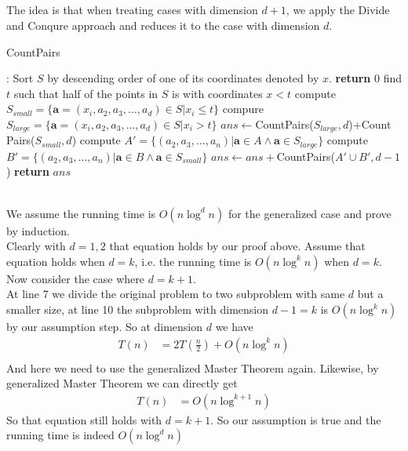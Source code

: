 \documentclass[12pt,letterpaper]{article}
\begin{document}
\subsection{}
The idea is that when treating cases with dimension $d+1$, we apply the Divide and Conqure approach and reduces it to the case with dimension $d$.
\begin{algorithm}
    \caption{CountPairs}\label{alg:countfinal}
    \begin{algorithmic}[1]
    :
    \State Sort $S$ by descending order of one of its coordinates denoted by $x$.
     \textbf{return} 0
    \EndIf
    \State find $t$ such that half of the points in $S$ is with coordinates $x<t$ 
    \State compute $S_{small}=\{\boldsymbol{a}=(x_i,a_2,a_3,\dots,a_d)\in S|x_i\leq t\}$ 
    \State compure $S_{large}=\{\boldsymbol{a}=(x_i,a_2,a_3,\dots,a_d)\in S|x_i> t\}$  
    \State $ans\gets $CountPairs($S_{large},d$)+Count Pairs($S_{small},d$)
    \State compute $A'=\{(a_2,a_3,\dots,a_n)|\boldsymbol{a}\in A\wedge \boldsymbol{a}\in S_{large}\}$ 
    \State compute $B'=\{(a_2,a_3,\dots,a_n)|\boldsymbol{a}\in B\wedge \boldsymbol{a}\in S_{small}\}$
    \State $ans\gets ans+$CountPairs($A'\cup B',d-1$)
    \State \textbf{return} $ans$
    \EndProcedure
    \end{algorithmic}
\end{algorithm}\\
We assume the running time is $O(n\log^dn)$ for the generalized case and prove by induction.\\
Clearly with $d=1,2$ that equation holds by our proof above. Assume that equation holds when $d=k$, i.e. the running time is $O(n\log^kn)$ when $d=k$. Now consider the case where $d=k+1$. \\
At line 7 we divide the original problem to two subproblem with same $d$ but a smaller size, at line 10 the subproblem with dimension $d-1=k$ is $O(n\log^kn)$ by our assumption step. So at dimension $d$ we have 
\begin{align}
    T(n)&=2T(\frac{n}{2})+O(n\log^kn)\\
\end{align}
And here we need to use the generalized Master Theorem again. Likewise, by generalized Master Theorem we can directly get
\begin{align}
    T(n)&=O(n\log^{k+1}n)
\end{align}
So that equation still holds with $d=k+1$. So our assumption is true and the running time is indeed $O(n\log^dn)$
\end{document}
